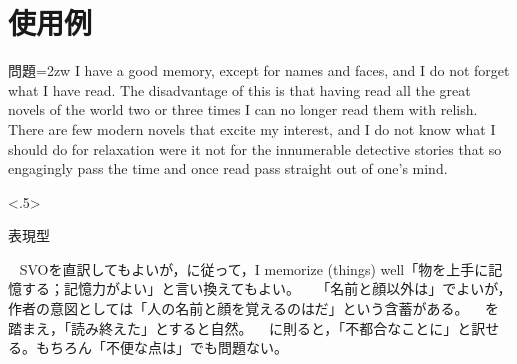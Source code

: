 \documentclass[dvipdfmx,b5j,10pt]{jsarticle}%
\begin{document}
\newpage

\section{使用例}\plfamily

\begin{ascolorbox4}{問題}\parindent=2zw
I have a good memory, except for names and faces, and I do not forget what I have read. The disadvantage of this is that having read all the great novels of the world two or three times I can no longer read them with relish. There are few modern novels that excite my interest, and I do not know what I should do for relaxation were it not for the innumerable detective stories that so engagingly pass the time and once read pass straight out of one's mind.
\end{ascolorbox4}%
\begin{chuushaku}[.7]<.5>
\begin{鉄壁カラーボックス}{\!\!表現型\!\!}\noindent{}\end{鉄壁カラーボックス}%
~%
SVOを直訳してもよいが，\noindent に従って，I memorize (things) well「物を上手に記憶する；記憶力がよい」と言い換えてもよい。%
~%
「名前と顔以外は」でよいが，作者の意図としては「人の名前と顔を覚えるのはだ」という含蓄がある。%
~%
\noindent を踏まえ，「読み終えた」とすると自然。%
~%
%
\noindent に則ると，「不都合なことに」と訳せる。もちろん「不便な点は」でも問題ない。%
\end{chuushaku}
\end{document}
